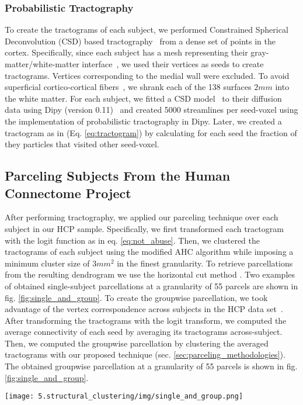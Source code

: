 \subsubsection{Probabilistic Tractography}
To create the tractograms of each subject, we performed Constrained Spherical 
Deconvolution (CSD) based tractography~\citep{Tournier2004} from a dense set of
points in the cortex. Specifically, since each subject has a mesh representing
their gray-matter/white-matter interface~\citep{Glasser2013}, we used their
vertices as seeds to create tractograms. Vertices corresponding to the medial
wall were excluded. To avoid superficial cortico-cortical fibers~\citep{Reveley2015},
we shrank each of the 138 surfaces $2mm$ into the white matter. For each subject,
we fitted a CSD model~\citep{Tournier2004} to their diffusion data using Dipy
(version 0.11)~\citep{Garyfallidis2014} and created 5000 streamlines per seed-voxel
using the implementation of probabilistic tractography in Dipy. Later, we
created a tractogram as in (Eq. \ref{eq:tractogram}) by calculating for each
seed the fraction of they particles that visited other seed-voxel.
%
\subsection{Parceling Subjects From the Human Connectome Project}
After performing tractography, we applied our parceling technique over each
subject in our HCP sample. Specifically, we first transformed each tractogram 
with the logit function as in eq. \ref{eq:not_abuse}. Then,
we clustered the tractograms of each subject using the modified AHC algorithm
while imposing a minimum cluster size of $3mm^2$ in the finest granularity.
To retrieve parcellations from the resulting dendrogram we use the horizontal cut
method \citep{Murtagh2011, Moreno-Dominguez2014, Gallardo2017}. Two examples of
obtained single-subject parcellations at a granularity of 55 parcels are shown
in fig. \ref{fig:single_and_group}.
%
To create the groupwise parcellation, we took advantage of the vertex
correspondence across subjects in the HCP data set~\citep{Glasser2013}. After
transforming the tractograms with the logit transform, we computed the average
connectivity of each seed by averaging its tractograms across-subject. Then, we
computed the groupwise parcellation by clustering the averaged tractograms with our
proposed technique (sec. \ref{sec:parceling_methodologies}). The obtained groupwise 
parcellation at a granularity of 55 parcels is shown in fig.
\ref{fig:single_and_group}.
%
\begin{figure*}
    \texttt{[image: 5.structural\_clustering/img/single\_and\_group.png]}
    \caption{Examples of two single-subject parcellations and the groupwise parcellations
    		 computed with our technique. All the parcellations shown have 55 parcels.
             The corresponding dendrogram for each case, along with the chosen cut height
             (red line) are shown. The groupwise parcellation
             is based on 138 subjects from the Human Connectome Project.}
    \label{fig:single_and_group}
\end{figure*}
%
